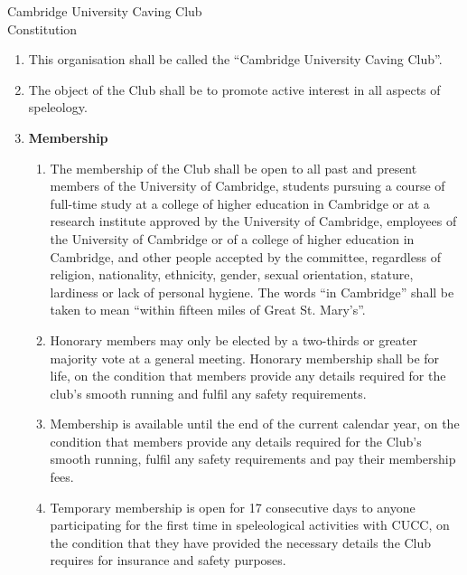 \documentclass[a4paper,11pt]{article}
\begin{document}
{\titlefontsmall Cambridge University Caving Club}\smallskip\\
{\titlefont Constitution}\medskip\\

\begin{enumerate}
\item This organisation shall be called the ``Cambridge University Caving Club''.

\item The object of the Club shall be to promote active interest in all aspects of
speleology.

\item {\bf Membership}

\begin{enumerate}

\item The membership of the Club shall be open to all past and present members
of the University of Cambridge, students pursuing a course of full-time study
at a college of higher education in Cambridge or at a research institute
approved by the University of Cambridge, employees of the University of
Cambridge or of a college of higher education in Cambridge, and other people
accepted by the committee, regardless of religion, nationality, ethnicity,
gender, sexual orientation, stature, lardiness or lack of personal hygiene. The
words ``in Cambridge'' shall be taken to mean ``within fifteen miles of
Great St. Mary's''. 

\item Honorary members may only be elected by a two-thirds or greater
majority vote at a general meeting. Honorary membership shall be for
life, on the condition that members provide any details required for the
club's smooth running and fulfil any safety requirements.

\item \sloppy Membership is available until the end of the current calendar
year, on the condition that members provide any details required for the
Club's smooth running, fulfil any safety requirements and pay their
membership fees.

\item Temporary membership is open for 17 consecutive days to anyone
participating for the first time in speleological activities with CUCC,
on the condition that they have provided the necessary details the
Club requires for insurance and safety purposes.

\end{enumerate}


\end{enumerate}
\end{document}
